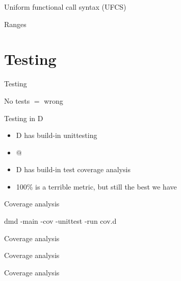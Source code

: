 \documentclass[aspectratio=169,notes]{beamer}
\begin{document}
	\begin{frame}[fragile]{Uniform functional call syntax (UFCS)}
		
	\end{frame}

	\begin{frame}[fragile]{Ranges}
		
	\end{frame}

	\section{Testing}
	\begin{frame}[fragile]{Testing}
		\begin{center}
		\Large No tests $=$ wrong
		\end{center}
	\end{frame}

	\begin{frame}[fragile]{Testing in D}
		\begin{itemize}
			\item D has build-in unittesting
			\item \lstinline@unittest { }@
			\item D has build-in test coverage analysis
			\item 100\% is a terrible metric, but still the best we have
		\end{itemize}
	\end{frame}

	\begin{frame}[fragile]{Coverage analysis}
		
		dmd -main -cov -unittest -run cov.d
	\end{frame}

	\begin{frame}[fragile]{Coverage analysis}
		
	\end{frame}

	\begin{frame}[fragile]{Coverage analysis}
		
	\end{frame}

	\begin{frame}[fragile]{Coverage analysis}
		
	\end{frame}
\end{document}
